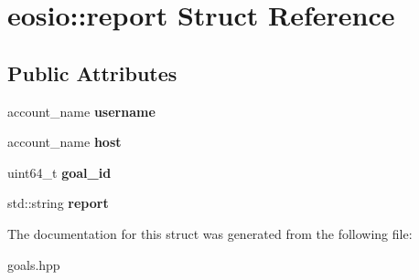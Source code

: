 \hypertarget{structeosio_1_1report}{}\section{eosio\+:\+:report Struct Reference}
\label{structeosio_1_1report}
\subsection*{Public Attributes}
\begin{DoxyCompactItemize}
\item 
\mbox{\label{structeosio_1_1report_a7d4f2eee6443a4f020a7689dbfa97f22}} 
account\+\_\+name {\bfseries username}
\item 
\mbox{\label{structeosio_1_1report_a6d332c008864bfba2a9384e1d96d439c}} 
account\+\_\+name {\bfseries host}
\item 
\mbox{\label{structeosio_1_1report_a750220cfec2f9461e7a086e1ddf7bb75}} 
uint64\+\_\+t {\bfseries goal\+\_\+id}
\item 
\mbox{\label{structeosio_1_1report_aa27ee8c03e8aa69a70719c42801550b9}} 
std\+::string {\bfseries report}
\end{DoxyCompactItemize}


The documentation for this struct was generated from the following file\+:\begin{DoxyCompactItemize}
\item 
goals.\+hpp\end{DoxyCompactItemize}

